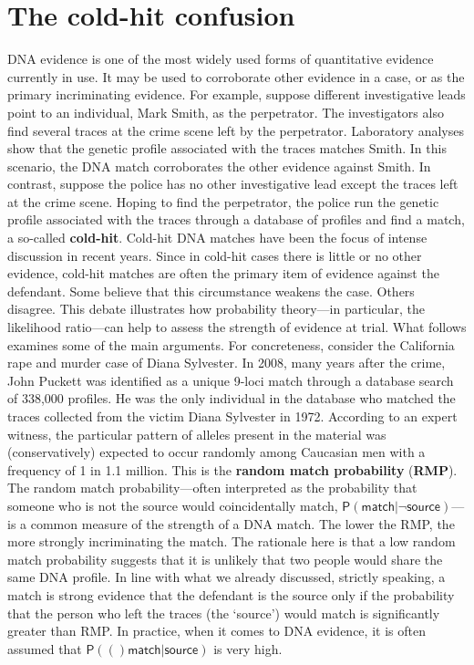 \documentclass[10pt,dvipsnames,enabledeprecatedfontcommands]{scrartcl}
\newcommand{\pr}[1]{\mathsf{P}(#1)}
\begin{document}
\section{\texorpdfstring{The cold-hit confusion
\label{subsec:coldHitConfusion}}{The cold-hit confusion }}\label{the-cold-hit-confusion}

DNA evidence is one of the most widely used forms of quantitative
evidence currently in use. It may be used to corroborate other evidence
in a case, or as the primary incriminating evidence. For example,
suppose different investigative leads point to an individual, Mark
Smith, as the perpetrator. The investigators also find several traces at
the crime scene left by the perpetrator. Laboratory analyses show that
the genetic profile associated with the traces matches Smith. In this
scenario, the DNA match corroborates the other evidence against Smith.
In contrast, suppose the police has no other investigative lead except
the traces left at the crime scene. Hoping to find the perpetrator, the
police run the genetic profile associated with the traces through a
database of profiles and find a match, a so-called \textbf{cold-hit}.
Cold-hit DNA matches have been the focus of intense discussion in recent
years. Since in cold-hit cases there is little or no other evidence,
cold-hit matches are often the primary item of evidence against the
defendant. Some believe that this circumstance weakens the case. Others
disagree. This debate illustrates how probability theory---in
particular, the likelihood ratio---can help to assess the strength of
evidence at trial. What follows examines some of the main arguments. For
concreteness, consider the California rape and murder case of Diana
Sylvester. In 2008, many years after the crime, John Puckett was
identified as a unique 9-loci match through a database search of 338,000
profiles. He was the only individual in the database who matched the
traces collected from the victim Diana Sylvester in 1972. According to
an expert witness, the particular pattern of alleles present in the
material was (conservatively) expected to occur randomly among Caucasian
men with a frequency of 1 in 1.1 million. This is the
\textbf{random match probability} (\textbf{RMP}). The random match
probability---often interpreted as the probability that someone who is
not the source would coincidentally match,
\(\pr{\textsf{match} \vert \neg \textsf{source}}\)---is a common measure
of the strength of a DNA match. The lower the RMP, the more strongly
incriminating the match. The rationale here is that a low random match
probability suggests that it is unlikely that two people would share the
same DNA profile. In line with what we already discussed, strictly
speaking, a match is strong evidence that the defendant is the source
only if the probability that the person who left the traces (the
`source') would match is significantly greater than RMP. In practice,
when it comes to DNA evidence, it is often assumed that
\(\pr(\textsf{match} \vert \textsf{source})\) is very high.
\end{document}
